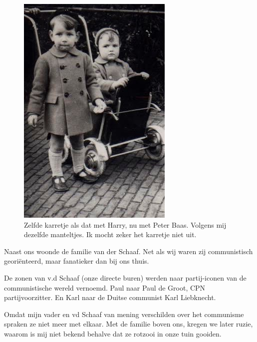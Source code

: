 \documentclass[12pt,twoside, openright]{memoir}
\begin{document}
\begin{figure}
\includegraphics[width=\textwidth]{img/ch5/peterme}
\caption*{\footnotesize Zelfde karretje als dat met Harry, nu met Peter Baas. Volgens mij dezelfde manteltjes. Ik mocht zeker het karretje niet uit.}
\end{figure}

Naast ons woonde de familie van der Schaaf. Net als wij waren zij communistisch georiënteerd, maar fanatieker dan bij ons thuis. 

De zonen van v.d Schaaf (onze directe buren) werden naar partij-iconen van de communistische wereld vernoemd. Paul naar Paul de Groot, CPN partijvoorzitter. En Karl naar de Duitse communist Karl Liebknecht. 

Omdat mijn vader en vd Schaaf van mening verschilden over het communisme spraken ze niet meer met elkaar. Met de familie boven ons, kregen we later ruzie, waarom is mij niet bekend behalve dat ze rotzooi in onze tuin gooiden. 
\end{document}
